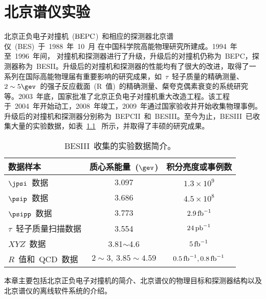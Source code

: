 
\chapter{北京谱仪实验}
\label{chap:bes3}

北京正负电子对撞机~(${\rm BEPC}$)~和相应的探测器北京谱仪~({BES})~于~{1988}~年~{10}~月
在中国科学院高能物理研究所建成。{1994}~年至~{1996}~年间，
对撞机和探测器进行了升级，升级后的对撞机仍称为~BEPC，探测器称为~BESII。升级后的对撞机和探测器的性能均有了很大的改进，取得了一系列在国际高能物理届有重要影响的研究成果，如~$\tau$~轻子质量的精确测量、$2 \sim 5 \gev$~的强子反应截面~(R~值)~的精确测量、粲夸克偶素衰变的系统研究等。2003~年底，国家批准了北京正负电子对撞机重大改造工程。该工程于~2004~年开始动工，2008~年竣工，2009~年通过国家验收并开始收集物理事例。升级后的对撞机和探测器分别称为~BEPCII~和~BESIII。至今为止，BESIII~已收集大量的实验数据，如表~\ref{tab:bes3data}~ 所示，并取得了丰硕的研究成果。

\begin{table}[!htb]
\centering
\small
\setlength{\abovecaptionskip}{0pt}
\setlength{\belowcaptionskip}{5pt}
\caption{BESIII~收集的实验数据简介。}
\begin{tabular}{lcc}
\toprule
数据样本 &  质心系能量~($\gev$) & 积分亮度或事例数 \\ \hline
$\jpsi$~数据 & $3.097$ & $1.3\times10^9$ \\
$\psip$~数据 & $3.686$ & $4.5\times10^8$ \\
    $\psipp$~数据 & $3.773$ & $2.9\,{\rm fb}^{-1}$ \\
    $\tau$~轻子质量扫描数据 & 3.554 & $24\,{\rm pb}^{-1}$ \\
    $XYZ$~数据 & 3.81$\sim$4.6 & $5\,{\rm fb}^{-1}$ \\
    $R$~值和~QCD~数据 & $2\sim3,\ 3.85\sim4.59$ & $0.5\,{\rm fb}^{-1},0.8\,\rm{fb}^{-1}$ \\
\bottomrule
\end{tabular}%
\label{tab:bes3data}
\end{table}

本章主要包括北京正负电子对撞机的简介、北京谱仪的物理目标和探测器结构以及北京谱仪的离线软件系统的介绍。

